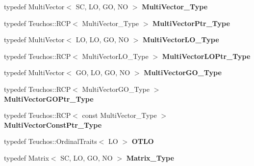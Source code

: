 \begin{DoxyCompactItemize}
\item 
\mbox{\label{classFEDD_1_1ErrorEstimation_ae656c560626c10f5fc6722f43e4281fc}} 
typedef Multi\+Vector$<$ SC, LO, GO, NO $>$ {\bfseries Multi\+Vector\+\_\+\+Type}
\item 
\mbox{\label{classFEDD_1_1ErrorEstimation_ae422943f76cfe9ada609671de16eb9c8}} 
typedef Teuchos\+::\+R\+CP$<$ Multi\+Vector\+\_\+\+Type $>$ {\bfseries Multi\+Vector\+Ptr\+\_\+\+Type}
\item 
\mbox{\label{classFEDD_1_1ErrorEstimation_adad31caec4b769abf8658c67001f977b}} 
typedef Multi\+Vector$<$ LO, LO, GO, NO $>$ {\bfseries Multi\+Vector\+L\+O\+\_\+\+Type}
\item 
\mbox{\label{classFEDD_1_1ErrorEstimation_a9d82d2ea10ef7ec6d16da19105a29a57}} 
typedef Teuchos\+::\+R\+CP$<$ Multi\+Vector\+L\+O\+\_\+\+Type $>$ {\bfseries Multi\+Vector\+L\+O\+Ptr\+\_\+\+Type}
\item 
\mbox{\label{classFEDD_1_1ErrorEstimation_aa9c88666e02916392baafb0f6f32a9ed}} 
typedef Multi\+Vector$<$ GO, LO, GO, NO $>$ {\bfseries Multi\+Vector\+G\+O\+\_\+\+Type}
\item 
\mbox{\label{classFEDD_1_1ErrorEstimation_a5593f5b047bcd78698da8d9d6c4a7e44}} 
typedef Teuchos\+::\+R\+CP$<$ Multi\+Vector\+G\+O\+\_\+\+Type $>$ {\bfseries Multi\+Vector\+G\+O\+Ptr\+\_\+\+Type}
\item 
\mbox{\label{classFEDD_1_1ErrorEstimation_a8caa4d56423da54bdfa117997252a400}} 
typedef Teuchos\+::\+R\+CP$<$ const Multi\+Vector\+\_\+\+Type $>$ {\bfseries Multi\+Vector\+Const\+Ptr\+\_\+\+Type}
\item 
\mbox{\label{classFEDD_1_1ErrorEstimation_ad2ca2ac7d7bb5251e9546a8a81077a34}} 
typedef Teuchos\+::\+Ordinal\+Traits$<$ LO $>$ {\bfseries O\+T\+LO}
\item 
\mbox{\label{classFEDD_1_1ErrorEstimation_a57f322063d7692248463f5f4fe859a25}} 
typedef Matrix$<$ SC, LO, GO, NO $>$ {\bfseries Matrix\+\_\+\+Type}

\end{DoxyCompactItemize}
